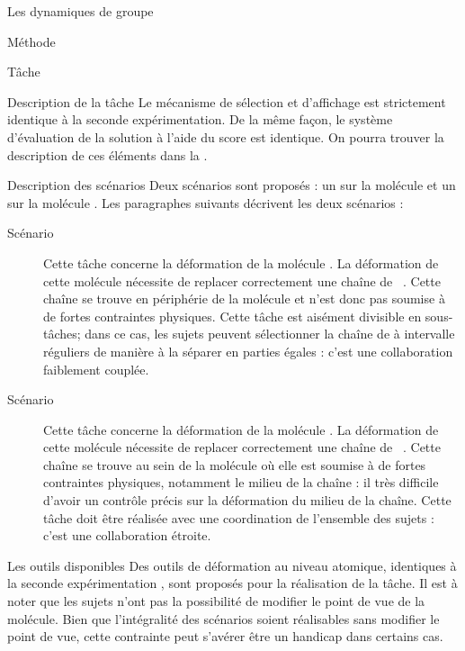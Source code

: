 \documentclass[myfrancais]{mythesis}
\begin{document}
\begin{mychapter}{Les dynamiques de groupe}
\begin{mysection}{Méthode}
\begin{mysubsection}{Tâche}
\begin{mysubsubsection}{Description de la tâche}
					Le mécanisme de sélection et d'affichage est strictement identique à la seconde expérimentation.
					De la même façon, le système d'évaluation de la solution à l'aide du score  est identique.
					On pourra trouver la description de ces éléments dans la .
				\end{mysubsubsection}
				\begin{mysubsubsection}{Description des scénarios}
					Deux scénarios sont proposés : un sur la molécule \myPrion et un sur la molécule \myUbiquitin.
					Les paragraphes suivants décrivent les deux scénarios :
					\begin{description}
						\item[Scénario~]
							Cette tâche concerne la déformation de la molécule \myPrion.
							La déformation de cette molécule nécessite de replacer correctement une chaîne de ~.
							Cette chaîne se trouve en périphérie de la molécule et n'est donc pas soumise à de fortes contraintes physiques.
							Cette tâche est aisément divisible en sous-tâches; dans ce cas, les sujets peuvent sélectionner la chaîne de  à intervalle réguliers de manière à la séparer en parties égales : c'est une collaboration faiblement couplée.
						\item[Scénario~]
							Cette tâche concerne la déformation de la molécule \myUbiquitin.
							La déformation de cette molécule nécessite de replacer correctement une chaîne de ~.
							Cette chaîne se trouve au sein de la molécule où elle est soumise à de fortes contraintes physiques, notamment le milieu de la chaîne : il très difficile d'avoir un contrôle précis sur la déformation du milieu de la chaîne.
							Cette tâche doit être réalisée avec une coordination de l'ensemble des sujets : c'est une collaboration étroite.
					\end{description}
				\end{mysubsubsection}
				\begin{mysubsubsection}{Les outils disponibles}
					Des outils de déformation au niveau atomique, identiques à la seconde expérimentation , sont proposés pour la réalisation de la tâche.
					Il est à noter que les sujets n'ont pas la possibilité de modifier le point de vue de la molécule.
					Bien que l'intégralité des scénarios soient réalisables sans modifier le point de vue, cette contrainte peut s'avérer être un handicap dans certains cas.

\end{mysubsubsection}
\end{mysubsection}
\end{mysection}
\end{mychapter}
\end{document}
